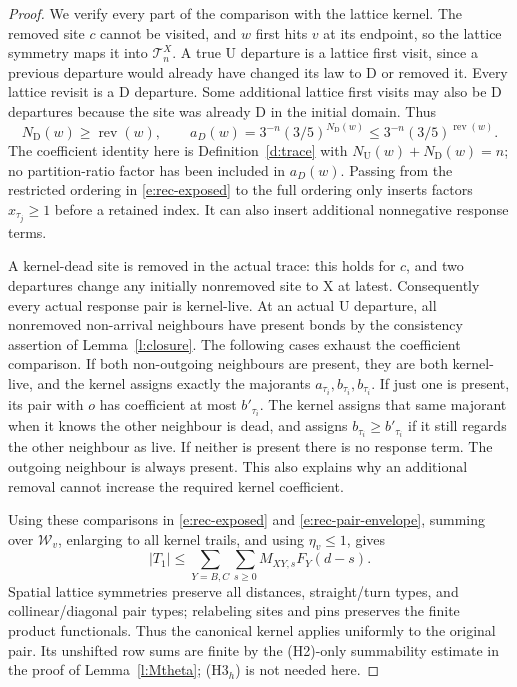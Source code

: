 \begin{proof}
We verify every part of the comparison with the lattice kernel.
The removed site \(c\) cannot be visited, and \(w\) first hits
\(v\) at its endpoint, so the lattice symmetry maps it into
\(\mathcal T_n^X\).  A true \(\mathrm U\) departure is a
lattice first visit, since a previous departure would already have
changed its law to \(\mathrm D\) or removed it.  Every lattice
revisit is a \(\mathrm D\) departure.  Some additional lattice
first visits may also be \(\mathrm D\) departures because the
site was already \(\mathrm D\) in the initial domain.  Thus
\[
 N_{\mathrm D}(w)\ge\operatorname{rev}(w),\qquad
 a_D(w)=3^{-n}(3/5)^{N_{\mathrm D}(w)}
             \le3^{-n}(3/5)^{\operatorname{rev}(w)}.
\]
The coefficient identity here is Definition~\ref{d:trace} with
\(N_{\mathrm U}(w)+N_{\mathrm D}(w)=n\); no partition-ratio
factor has been included in \(a_D(w)\).
Passing from the restricted ordering in \eqref{e:rec-exposed}
to the full ordering only inserts factors \(x_{\tau_j}\ge1\)
before a retained index.  It can also insert additional nonnegative
response terms.

A kernel-dead site is removed in the actual trace: this holds for
\(c\), and two departures change any initially nonremoved site
to \(\mathrm X\) at latest.  Consequently every actual response
pair is kernel-live.  At an actual \(\mathrm U\) departure, all
nonremoved non-arrival neighbours have present bonds by the
consistency assertion of Lemma~\ref{l:closure}.  The following
cases exhaust the coefficient comparison.  If both non-outgoing
neighbours are present, they are both kernel-live, and the kernel
assigns exactly the majorants \(a_{\tau_i},b_{\tau_i},b_{\tau_i}\).
If just one is present, its pair with \(o\) has coefficient
at most \(b'_{\tau_i}\).  The kernel assigns that same majorant
when it knows the other neighbour is dead, and assigns
\(b_{\tau_i}\ge b'_{\tau_i}\) if it still regards the other
neighbour as live.  If neither is present there is no response
term.  The outgoing neighbour is always present.  This also
explains why an additional removal cannot increase the required
kernel coefficient.

Using these comparisons in \eqref{e:rec-exposed} and
\eqref{e:rec-pair-envelope}, summing over \(\mathcal W_v\),
enlarging to all kernel trails, and using \(\eta_v\le1\), gives
\begin{equation}\label{e:rec-T1}
 |T_1|\le\sum_{Y=B,C}\sum_{s\ge0}M_{XY,s}F_Y(d-s).
\end{equation}
Spatial lattice symmetries preserve all distances, straight/turn
types, and collinear/diagonal pair types; relabeling sites and pins
preserves the finite product functionals.  Thus the canonical
kernel applies uniformly to the original pair.  Its unshifted
row sums are finite by the (H2)-only summability estimate in the
proof of Lemma~\ref{l:Mtheta}; (H3\(_h\)) is not needed here.


\end{proof}
